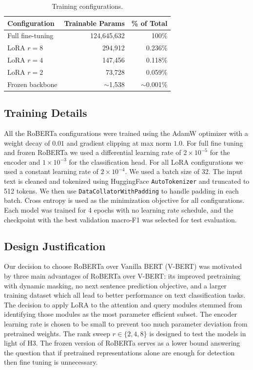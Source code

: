 \documentclass{article}
\begin{document}
\begin{table}[H]
    \centering
    \caption{Training configurations.}
    \label{tab:params}
    \footnotesize
    \begin{tabular}{@{}lrr@{}}
        \toprule
        Configuration    & Trainable Params & \% of Total   \\
        \midrule
        Full fine-tuning & 124,645,632      & 100\%         \\
        LoRA $r=8$       & 294,912          & 0.236\%       \\
        LoRA $r=4$       & 147,456          & 0.118\%       \\
        LoRA $r=2$       & 73,728           & 0.059\%       \\
        Frozen backbone  & $\sim$1,538      & $\sim$0.001\% \\
        \bottomrule
    \end{tabular}
\end{table}
\subsection{Training Details}
All the RoBERTa configurations were trained using the AdamW optimizer with a weight decay of $0.01$ and gradient clipping at max norm $1.0$. For full fine tuning and frozen RoBERTa we used a differential learning rate of $2 \times 10^{-5}$ for the encoder and $1 \times 10^{-3}$ for
the classification head. For all LoRA configurations we used a constant learning rate of $2 \times 10^{-4}$. We used a batch size of 32. The input text is cleaned and tokenized using  HuggingFace \texttt{AutoTokenizer} and truncated to 512 tokens. We then use \texttt{DataCollatorWithPadding} to handle padding in each batch. Cross entropy is used as the minimization objective for all configurations. Each model was trained for 4 epochs with no learning rate schedule, and the checkpoint with the best validation macro-F1 was selected for test evaluation.

\subsection{Design Justification}
Our decision to choose RoBERTa over Vanilla BERT (V-BERT) was motivated by three main advantages of RoBERTa over V-BERT: its improved pretraining with dynamic masking, no next sentence prediction objective, and a larger training dataset which all lead to better performance on text classification tasks. The decision to apply LoRA to the attention and query modules stemmed from \citet{hu2022lora} identifying those modules as the most parameter efficient subset. The encoder learning rate is chosen to be small to prevent too much parameter deviation from pretrained weights. The rank sweep $r \in \{2, 4, 8\}$ is designed to test the models in light of H3. The frozen version of RoBERTa serves as a lower bound answering the question that if pretrained representations alone are enough for detection then fine tuning is unnecessary.
\end{document}
